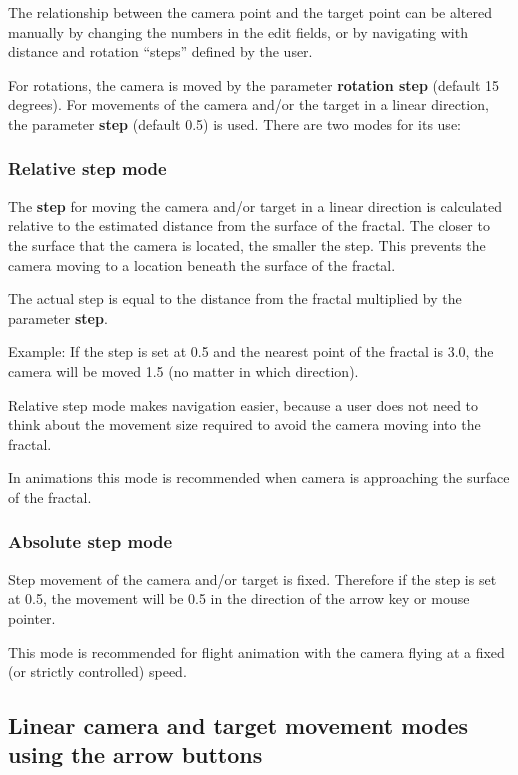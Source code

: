 The relationship between the camera point and the target point can be altered
manually by changing the numbers in the edit fields, or by navigating with
distance and rotation ``steps'' defined by the user.

For rotations, the camera is moved by the parameter \textbf{rotation step}
(default 15 degrees). For movements of the camera and/or the target in a linear
direction, the parameter \textbf{step} (default 0.5) is used. There are two
modes for its use:

\subsubsection{Relative step mode}\label{relative-step-mode}

The \textbf{step} for moving the camera and/or target in a linear direction is
calculated relative to the estimated distance from the surface of the fractal.
The closer to the surface that the camera is located, the smaller the step. This
prevents the camera moving to a location beneath the surface of the fractal.

The actual step is equal to the distance from the fractal multiplied by the
parameter \textbf{step}.

Example: If the step is set at 0.5 and the nearest point of the
fractal is 3.0, the camera will be moved 1.5 (no matter in which direction).

Relative step mode makes navigation easier, because a user does not need to think about the movement size required to avoid
the camera moving into the fractal.

In animations this mode is recommended when camera is approaching the surface of
the fractal.

\subsubsection{Absolute step mode}\label{absolute-step-mode}

Step movement of the camera and/or target is fixed. Therefore if the step is set
at 0.5, the movement will be 0.5 in the direction of the arrow key or mouse
pointer.

This mode is recommended for flight animation with the camera flying at a fixed (or strictly
controlled) speed.

\subsection{Linear camera and target movement modes using the arrow buttons}\label{linear-camera-and-target-movement-modes-using-the-arrow-buttons}

